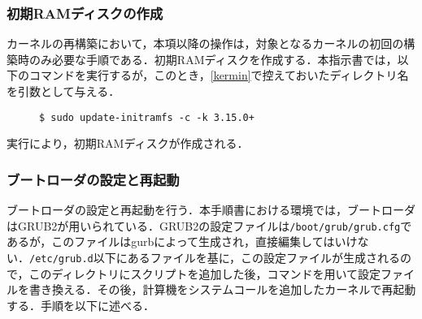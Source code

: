 \documentclass[12pt]{jsarticle}
\begin{document}
\subsubsection{初期RAMディスクの作成}
カーネルの再構築において，本項以降の操作は，対象となるカーネルの初回の構築時のみ必要な手順である．初期RAMディスクを作成する．本指示書では，以下のコマンドを実行するが，このとき，\ref{kermin}で控えておいたディレクトリ名を引数として与える．
\begin{description}
\item[] \verb|$ sudo update-initramfs -c -k 3.15.0+|
\end{description}
実行により，初期RAMディスクが作成される．
\subsubsection{ブートローダの設定と再起動}
ブートローダの設定と再起動を行う．本手順書における環境では，ブートローダはGRUB2が用いられている．GRUB2の設定ファイルは\verb|/boot/grub/grub.cfg|であるが，このファイルはgurbによって生成され，直接編集してはいけない．\verb|/etc/grub.d|以下にあるファイルを基に，この設定ファイルが生成されるので，このディレクトリにスクリプトを追加した後，コマンドを用いて設定ファイルを書き換える．その後，計算機をシステムコールを追加したカーネルで再起動する．手順を以下に述べる．
\end{document}
